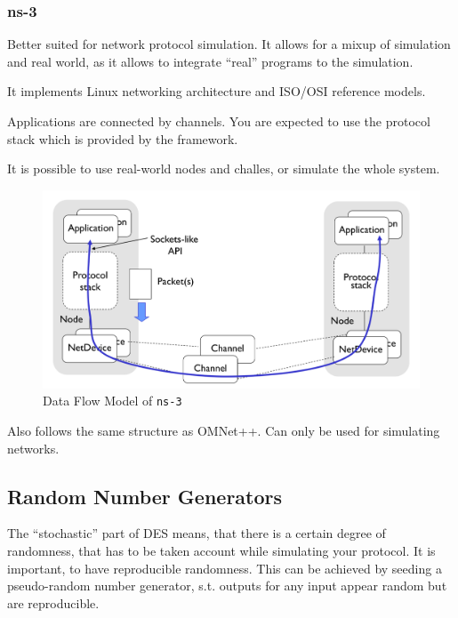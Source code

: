 \documentclass[english]{panikzettel}
\begin{document}
	\subsubsection{ns-3}
	\label{sss:simulation-framework:ns-3}
	
	\begin{halfboxl}
		Better suited for network protocol simulation.
		It allows for a mixup of simulation and real world, as it allows to integrate \enquote{real} programs to the simulation.
		
		It implements Linux networking architecture and ISO/OSI reference models.
		
		Applications are connected by channels. You are expected to use the protocol stack which is provided by the framework.
		
		It is possible to use real-world nodes and challes, or simulate the whole system.
	\end{halfboxl}%
	\begin{halfboxr}
		\vspace{-\baselineskip}
		\begin{figure}[H]
			\centering
			\includegraphics[width=\textwidth]{img/5-ns-3.png}
			\caption{Data Flow Model of \texttt{ns-3}}
			\label{img-5-ns-3}
		\end{figure}
	\end{halfboxr}

	Also follows the same structure as OMNet++.
	Can only be used for simulating networks.

	\subsection{Random Number Generators}
	\label{ss:discrete-event-simulation:random-number-generators}
	
	The \enquote{stochastic} part of DES means, that there is a certain degree of randomness, that has to be taken account while simulating your protocol.
	It is important, to have reproducible randomness. 
	This can be achieved by seeding a pseudo-random number generator, s.t. outputs for any input appear random but are reproducible.
	
\end{document}
